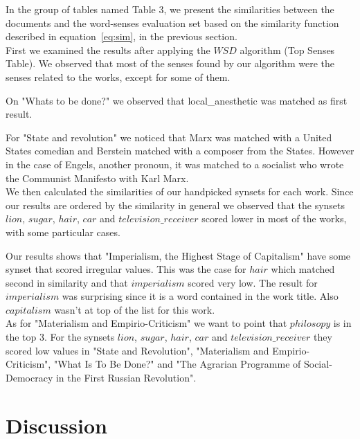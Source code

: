 \documentclass{pnastwo}
\begin{document}
\begin{article}
In the group of tables named Table 3, we present the similarities between the documents and the word-senses evaluation set based on the similarity function described in equation~\ref{eq:sim}, in the previous section.\\





First we examined the results after applying the $WSD$ algorithm (Top Senses Table). We observed that most of the senses found by our algorithm were the senses related to the works, except for some of them.

On "Whats to be done?" we observed that local\_anesthetic was matched as first result. 

For "State and revolution" we noticed that Marx was matched with a United States comedian and Berstein matched with a composer from the States. However in the case of Engels, another pronoun, it was matched to a socialist who wrote the Communist Manifesto with Karl Marx. \\

We then calculated the similarities of our handpicked synsets for each work. Since our results are ordered by the similarity in general we observed that the synsets $lion$, $sugar$, $hair$, $car$ and $television\_receiver$ scored lower in most of the works, with some particular cases. 

Our results shows that "Imperialism, the Highest Stage of Capitalism" have some synset that scored irregular values. This was the case for $hair$ which matched second in similarity and that $imperialism$ scored very low. The result for $imperialism$ was surprising since it is a word contained in the work title. Also $capitalism$ wasn't at top of the list for this work.\\

As for "Materialism and Empirio-Criticism" we want to point that $philosopy$ is in the top $3$.
For the synsets $lion$, $sugar$, $hair$, $car$ and $television\_receiver$ they scored low values in  "State and Revolution", "Materialism and Empirio-Criticism", "What Is To Be Done?" and "The Agrarian Programme of Social-Democracy in the First Russian Revolution".



\section{Discussion}



\end{article}
\end{document}
